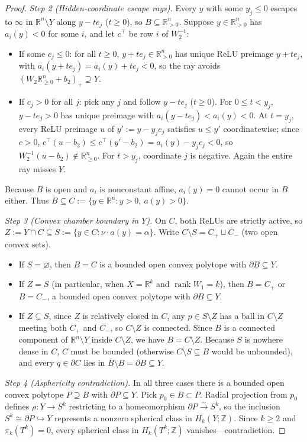 \documentclass[11pt]{article}
\theoremstyle{plain}
\theoremstyle{definition}
\theoremstyle{remark}
\DeclareMathOperator{\rank}{rank}
\begin{document}
\begin{proof}
\emph{Step 2 (Hidden-coordinate escape rays).} Every $y$ with some $y_j \le 0$ escapes to $\infty$ in $\mathbb{R}^n \setminus Y$ along $y - t e_j$ ($t \ge 0$), so $B \subseteq \mathbb{R}_{>0}^n$. Suppose $y \in \mathbb{R}_{>0}^n$ has $a_i(y) < 0$ for some $i$, and let $c^\top$ be row $i$ of $W_2^{-1}$:
\begin{itemize}[leftmargin=2em,itemsep=1pt]
\item If some $c_j \le 0$: for all $t \ge 0$, $y + t e_j \in \mathbb{R}_{>0}^n$ has unique ReLU preimage $y + t e_j$, with $a_i(y + t e_j) = a_i(y) + t c_j < 0$, so the ray avoids $(W_2 \mathbb{R}_{\ge 0}^n + b_2)_+ \supseteq Y$.
\item If $c_j > 0$ for all $j$: pick any $j$ and follow $y - t e_j$ ($t \ge 0$). For $0 \le t < y_j$, $y - t e_j > 0$ has unique preimage with $a_i(y - t e_j) < a_i(y) < 0$. At $t = y_j$, every ReLU preimage $u$ of $y' := y - y_j e_j$ satisfies $u \le y'$ coordinatewise; since $c > 0$, $c^\top(u - b_2) \le c^\top(y' - b_2) = a_i(y) - y_j c_j < 0$, so $W_2^{-1}(u - b_2) \notin \mathbb{R}_{\ge 0}^n$. For $t > y_j$, coordinate $j$ is negative. Again the entire ray misses $Y$.
\end{itemize}
Because $B$ is open and $a_i$ is nonconstant affine, $a_i(y) = 0$ cannot occur in $B$ either. Thus $B \subseteq C := \{y \in \mathbb{R}^n : y > 0,\ a(y) > 0\}$.

\emph{Step 3 (Convex chamber boundary in $Y$).} On $C$, both ReLUs are strictly active, so $Z := Y \cap C \subseteq S := \{y \in C : \nu \cdot a(y) = \alpha\}$. Write $C \setminus S = C_+ \sqcup C_-$ (two open convex sets).
\begin{itemize}[leftmargin=2em,itemsep=1pt]
\item If $S = \varnothing$, then $B = C$ is a bounded open convex polytope with $\partial B \subseteq Y$.
\item If $Z = S$ (in particular, when $X = \mathbb{R}^k$ and $\rank W_1 = k$), then $B = C_+$ or $B = C_-$, a bounded open convex polytope with $\partial B \subseteq Y$.
\item If $Z \subsetneq S$, since $Z$ is relatively closed in $C$, any $p \in S \setminus Z$ has a ball in $C \setminus Z$ meeting both $C_+$ and $C_-$, so $C \setminus Z$ is connected. Since $B$ is a connected component of $\mathbb{R}^n \setminus Y$ inside $C \setminus Z$, we have $B = C \setminus Z$. Because $S$ is nowhere dense in $C$, $C$ must be bounded (otherwise $C \setminus S \subseteq B$ would be unbounded), and every $q \in \partial C$ lies in $\overline{B} \setminus B = \partial B \subseteq Y$.
\end{itemize}

\emph{Step 4 (Asphericity contradiction).} In all three cases there is a bounded open convex polytope $P \supseteq B$ with $\partial P \subseteq Y$. Pick $p_0 \in B \subset P$. Radial projection from $p_0$ defines $\rho : Y \to S^k$ restricting to a homeomorphism $\partial P \xrightarrow{\sim} S^k$, so the inclusion $S^k \cong \partial P \hookrightarrow Y$ represents a nonzero spherical class in $H_k(Y; \mathbb{Z})$. Since $k \ge 2$ and $\pi_k(T^k) = 0$, every spherical class in $H_k(T^k; \mathbb{Z})$ vanishes---contradiction.
\end{proof}
\end{document}
